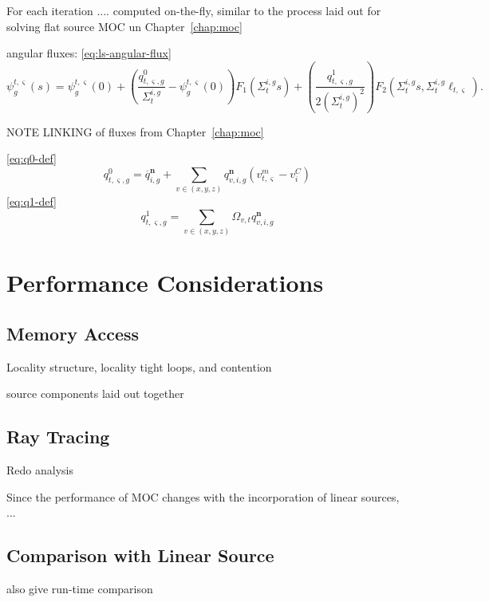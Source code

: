 For each iteration .... computed on-the-fly, similar to the process laid out for solving flat source \ac{MOC} un Chapter~\ref{chap:moc}

angular fluxes:
\ref{eq:ls-angular-flux}
\begin{equation}
\psi_g^{t,\varsigma}(s) = \psi_g^{t,\varsigma}(0) + \left( \frac{q^0_{t,\varsigma,g}}{\Sigma_{t}^{i,g}} - \psi_g^{t,\varsigma}(0) \right) F_1\left(\Sigma_{t}^{i,g} s \right) + \left(\frac{q^1_{t,\varsigma,g}}{2\left(\Sigma_{t}^{i,g}\right)^2}\right) F_2\left(\Sigma_{t}^{i,g} s, \Sigma_{t}^{i,g} \ell_{t,\varsigma} \right).
\end{equation}

NOTE LINKING of fluxes from Chapter~\ref{chap:moc}

\ref{eq:q0-def}
\begin{equation}
q^0_{t,\varsigma,g} = \overline{q}_{i,g}^{\mathbf{n}} + \sum_{v \in (x,y,z)} q_{v,i,g}^{\mathbf{n}} \left( v^m_{t,\varsigma} - v^C_i \right)
\end{equation}
\ref{eq:q1-def}
\begin{equation}
q^1_{t,\varsigma,g} = \sum_{v \in (x,y,z)} \Omega_{v,t} q_{v,i,g}^{\mathbf{n}}
\end{equation}



\section{Performance Considerations}
\label{sec:ls-performance}


\subsection{Memory Access}

Locality structure, locality tight loops, and contention

source components laid out together

\subsection{Ray Tracing}

Redo analysis

Since the performance of \ac{MOC} changes with the incorporation of linear sources, ...

\subsection{Comparison with Linear Source}
also give run-time comparison


